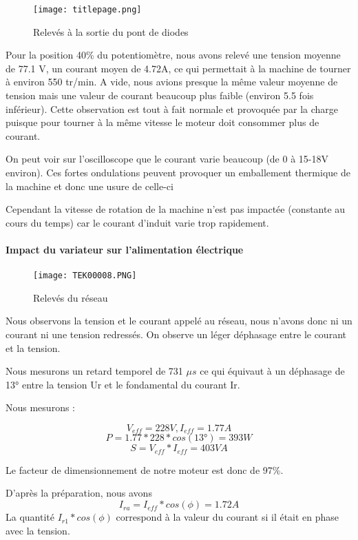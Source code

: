 \documentclass[oneside,a4paper,12pt]{article}
\begin{document}
	\begin{figure}[h]
		\centering
		\texttt{[image: titlepage.png]}
		\caption{Relevés à la sortie du pont de diodes}
	\end{figure}

	Pour la position 40\% du potentiomètre, nous avons relevé une tension moyenne de 77.1 V, un courant moyen de 4.72A, ce qui permettait à la machine de tourner à environ 550 tr/min. 
	A vide, nous avions presque la même valeur moyenne de tension mais une valeur de courant beaucoup plus faible (environ 5.5 fois inférieur). Cette observation est tout à fait normale et provoquée par la charge puisque pour tourner à la même vitesse le moteur doit consommer plus de courant.

	On peut voir sur l’oscilloscope que le courant varie beaucoup (de 0 à 15-18V environ). Ces fortes ondulations peuvent provoquer un emballement thermique de la machine et donc une usure de celle-ci

	Cependant la vitesse de rotation de la machine n’est pas impactée (constante au cours du temps) car le courant d’induit varie trop rapidement.

	\paragraph{Impact du variateur sur l'alimentation électrique}
	\paragraph{}
	
	\begin{figure}[h]
		\centering
		\texttt{[image: TEK00008.PNG]}
		\caption{Relevés du réseau}
	\end{figure}

	Nous observons la tension et le courant appelé au réseau, nous n'avons donc ni un courant ni une tension redressés. On observe un léger déphasage entre le courant et la tension.

	Nous mesurons un retard temporel de 731 $\mu s$ ce qui équivaut à un déphasage de 13° entre la tension Ur et le fondamental du courant Ir.

	Nous mesurons :

	$$ V_{eff}=228V, I_{eff}=1.77A $$
	$$ P=1.77*228*cos(13°)=393W $$
	$$ S=V_{eff}*I_{eff}=403VA $$
	
	Le facteur de dimensionnement de notre moteur est donc de 97\%.
	
	D’après la préparation, nous avons $$I_{ra}= I_{eff}*cos(\phi)=1.72 A$$
	La quantité $I_{r1}*cos(\phi)$ correspond à la valeur du courant si il était en phase avec la tension.
	
\end{document}
